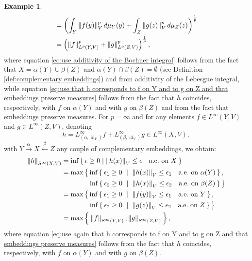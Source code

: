 \documentclass{amsart}
\theoremstyle{definition}
\newtheorem{example}[definition]{Example}
\theoremstyle{plain}
\newcommand{\norm}[1]{\left\lVert #1\right\rVert} %
\newcommand{\id}{\operatorname{id}}
\begin{document}
\begin{example}
\begin{align}
                &= \left( \int_{Y} \norm{f(y)}_V^p d\mu_{Y}(y) + \int_{Z} \norm{g(z)}_V^p d\mu_{Z}(z) \right)^{\frac{1}{p}} \label{eq:use that h corresponds to f on Y and to g on Z and that embeddings preserve measures} \\
                &= \left( \norm{f}_{L^p(Y,V)}^p + \norm{g}_{L^p(Z,V)}^p \right)^{\frac{1}{p}}, \notag
            \end{align}
            where equation \eqref{eq:use additivity of the Bochner integral} follows from the fact that $X = \alpha(Y) \cup \beta(Z)$ and $\alpha(Y) \cap \beta(Z) = \emptyset$ (see Definition \ref{def:complementary embeddings}) and from additivity of the Lebesgue integral, while equation \eqref{eq:use that h corresponds to f on Y and to g on Z and that embeddings preserve measures} follows from the fact that $h$ coincides, respectively, with $f$ on $\alpha(Y)$ and with $g$ on $\beta(Z)$ and from the fact that embeddings preserve measures.
            For $p = \infty$ and for any elements $f \in L^\infty{(Y,V)}$ and $g \in L^\infty{(Z,V)}$, denoting 
            \begin{equation*}
                h = L^\infty_{(\alpha,\id_V)}f + L^\infty_{(\beta,\id_V)}g \in L^\infty{(X,V)},
            \end{equation*}
            with $Y \xrightarrow{~\alpha~} X \xleftarrow{~\beta~} Z$ any couple of complementary embeddings, we obtain:
            \begin{align}
                \norm{h}_{S^\infty(X,V)} &= \inf \Set{\epsilon \geq 0 | \norm{h(x)}_V \leq \epsilon \quad \text{a.e.~on} ~ X} \notag \\
                &= \max \big\{ \inf \Set{\epsilon_1 \geq 0 ~|~ \norm{h(x)}_V \leq \epsilon_1 \quad \text{a.e.~on} ~ \alpha(Y)}, \notag \\
                &\qquad \qquad \inf \Set{\epsilon_2 \geq 0 ~|~ \norm{h(x)}_V \leq \epsilon_2 \quad \text{a.e.~on} ~ \beta(Z)} \big\} \notag \\
                &= \max \big\{ \inf \Set{\epsilon_1 \geq 0 ~|~ \norm{f(y)}_V \leq \epsilon_1 \quad \text{a.e.~on} ~ Y}, \label{eq:use again that h corresponds to f on Y and to g on Z and that embeddings preserve measures} \\
                &\qquad \qquad \inf \Set{\epsilon_2 \geq 0 ~|~ \norm{g(z)}_V \leq \epsilon_2 \quad \text{a.e.~on} ~ Z} \big\} \notag \\
                &= \max \Set{\norm{f}_{S^\infty(Y,V)},\norm{g}_{S^\infty(Z,V)}}, \notag
            \end{align}
            where equation \eqref{eq:use again that h corresponds to f on Y and to g on Z and that embeddings preserve measures} follows from the fact that $h$ coincides, respectively, with $f$ on $\alpha(Y)$ and with $g$ on $\beta(Z)$. 
        \end{example}
        
\end{document}
